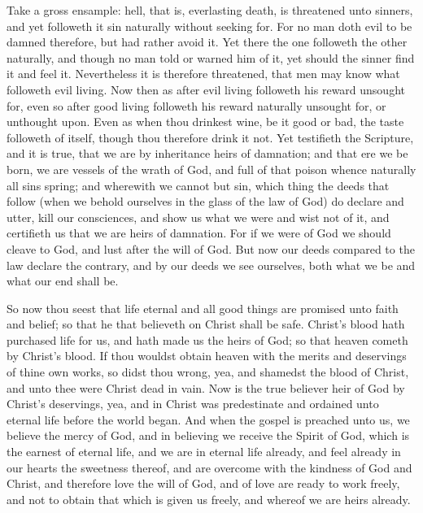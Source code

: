 Take a gross ensample: hell, that is, everlasting death, is 
threatened unto sinners, and yet followeth it sin naturally 
without seeking for. For no man doth evil to be damned 
therefore, but had rather avoid it. Yet there the one followeth
the other naturally, and though no man told or 
warned him of it, yet should the sinner find it and feel it. 
Nevertheless it is therefore threatened, that men may know 
what followeth evil living. Now then as after evil living 
followeth his reward unsought for, even so after good living 
followeth his reward naturally unsought for, or unthought 
upon. Even as when thou drinkest wine, be it good or 
bad, the taste followeth of itself, though thou therefore 
drink it not. Yet testifieth the Scripture, and it is true, 
that we are by inheritance heirs of damnation; and that 
ere we be born, we are vessels of the wrath of God, and 
full of that poison whence naturally all sins spring; and 
wherewith we cannot but sin, which thing the deeds that 
follow (when we behold ourselves in the glass of the law of 
God) do declare and utter, kill our consciences, and show 
us what we were and wist not of it, and certifieth us that 
we are heirs of damnation. For if we were of God we 
should cleave to God, and lust after the will of God. But 
now our deeds compared to the law declare the contrary, 
and by our deeds we see ourselves, both what we be and 
what our end shall be. 

So now thou seest that life eternal and all good things 
are promised unto faith and belief; so that he that believeth
on Christ shall be safe. Christ's blood hath purchased
life for us, and hath made us the heirs of God; so 
that heaven cometh by Christ's blood. If thou wouldst 
obtain heaven with the merits and deservings of thine own 
works, so didst thou wrong, yea, and shamedst the blood 
of Christ, and unto thee were Christ dead in vain. Now 
is the true believer heir of God by Christ's deservings, yea, 
and in Christ was predestinate and ordained unto eternal 
life before the world began. And when the gospel is 
preached unto us, we believe the mercy of God, and in believing
we receive the Spirit of God, which is the earnest 
of eternal life, and we are in eternal life already, and feel 
already in our hearts the sweetness thereof, and are overcome
with the kindness of God and Christ, and therefore 
love the will of God, and of love are ready to work freely, 
and not to obtain that which is given us freely, and whereof 
we are heirs already. 

